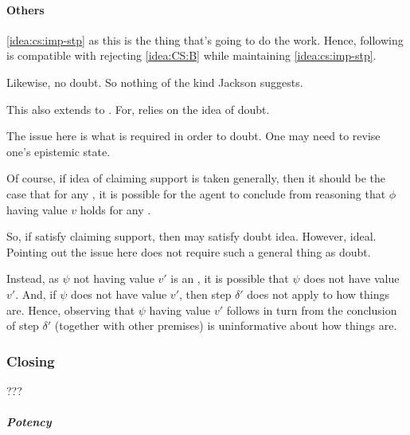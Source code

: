 \paragraph{Others}

\begin{note}
  \autoref{idea:cs:imp-stp} as this is the thing that's going to do the work.
  Hence, following is compatible with rejecting \autoref{idea:CS:B} while maintaining \autoref{idea:cs:imp-stp}.

  Likewise, no doubt.
  So nothing of the kind Jackson suggests.

  This also extends to \citeauthor{Wright:2011wn}.
  For, \citeauthor{Wright:2011wn} relies on the idea of doubt.

  The issue here is what is required in order to doubt.
  One may need to revise one's epistemic state.

  Of course, if idea of claiming support is taken generally, then it should be the case that for any \epP{} \world{}, it is possible for the agent to conclude from reasoning that \(\phi\) having value \(v\) holds for any \epVAd{} \world{}.

  So, if satisfy claiming support, then may satisfy doubt idea.
  However, ideal.
  Pointing out the issue here does not require such a general thing as doubt.
\end{note}

\begin{note}
  Instead, as \(\psi\) not having value \(v'\) is an \ep{}, it is possible that \(\psi\) does not have value \(v'\).
  And, if \(\psi\) does not have value \(v'\), then step \(\delta'\) does not apply to how things are.
  Hence, observing that \(\psi\) having value \(v'\) follows in turn from the conclusion of step \(\delta'\) (together with other premises) is uninformative about how things are.
\end{note}





\subsubsection{Closing \ideaCS{}}
\label{sec:closing-ideacs}

\begin{note}
  ???
\end{note}

\hozline




\subparagraph{Potency}

